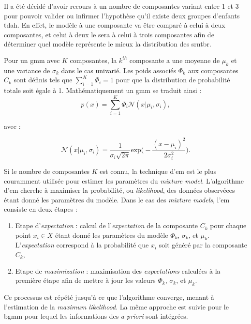 Il a été décidé d'avoir recours à un nombre de composantes variant entre 1 et 3 pour pouvoir valider ou infirmer l'hypothèse qu'il existe deux groupes d'enfants \gls{tdah}.
En effet, le modèle à une composante va être comparé à celui à deux composantes, et celui à deux le sera à celui à trois composantes afin de déterminer quel modèle 
représente le mieux la distribution des \gls{srntbr}. 

Pour un \gls{gmm} avec $K$ composantes, la $k^{th}$ composante a une moyenne de $\mu_k$ et une variance de $\sigma_k$ dans le cas univarié. Les poids associés $\Phi_k$ aux composantes
$C_k$ sont définis tels que $\sum_{i=1}^{K} \Phi_i = 1$ pour que la distribution de probabilité totale soit égale à 1. Mathématiquement un \gls{gmm} se traduit ainsi \citep{Santosh2013} :
\begin{equation}
\label{eq:tbr_gmm_univariate}
p(x) = \sum_{i=1}^{K} \Phi_i\mathcal{N}( x | \mu_i, \sigma_i),
\end{equation}

avec :

\begin{equation}
\label{eq:tbr_gaussian}
\mathcal{N}( x | \mu_i, \sigma_i) = \frac{1}{\sigma_i\sqrt{2\pi}} \text{exp}\Big(-\frac{(x - \mu_i)^2}{2\sigma_i^2}\Big).
\end{equation}

Si le nombre de composantes $K$ est connu, la technique d'\gls{em} est le plus couramment utilisée pour estimer les paramètres du \textit{mixture model}. L'algorithme d'\gls{em}
cherche à maximiser la probabilité, ou \textit{likelihood}, des données observéees étant donné les paramètres du modèle. Dans le cas des \textit{mixture models}, l'\gls{em}
consiste en deux étapes :
\begin{enumerate}
\item Etape d'\textit{expectation} : calcul de l'\textit{expectation} de la composante $C_k$ pour chaque point $x_i \in X$ étant donné les paramètres du modèle $\Phi_k$, $\sigma_k$,
et $\mu_k$. L'\textit{expectation} correspond à la probabilité que $x_i$ soit généré par la composante $C_k$,
\item Etape de \textit{maximization} : maximisation des \textit{expectations} calculées à la première étape afin de mettre à jour les valeurs $\Phi_k$, $\sigma_k$,
et $\mu_k$. 
\end{enumerate}

Ce processus est répété jusqu'à ce que l'algorithme converge, menant à l'estimation de la \textit{maximum likelihood}. La même approche est suivie pour le \gls{bgmm} pour lequel 
les informations des \textit{a priori} sont intégrées. 

